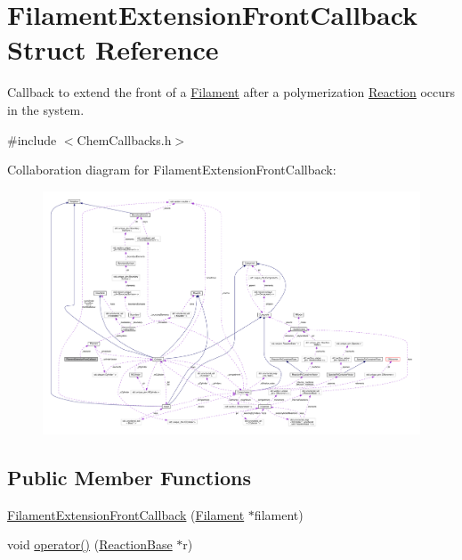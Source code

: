 \hypertarget{structFilamentExtensionFrontCallback}{\section{Filament\+Extension\+Front\+Callback Struct Reference}
\label{structFilamentExtensionFrontCallback}
}


Callback to extend the front of a \hyperlink{classFilament}{Filament} after a polymerization \hyperlink{classReaction}{Reaction} occurs in the system.  




{\ttfamily \#include $<$Chem\+Callbacks.\+h$>$}



Collaboration diagram for Filament\+Extension\+Front\+Callback\+:
\nopagebreak
\begin{figure}[H]
\begin{center}
\leavevmode
\includegraphics[width=350pt]{structFilamentExtensionFrontCallback__coll__graph}
\end{center}
\end{figure}
\subsection*{Public Member Functions}
\begin{DoxyCompactItemize}
\item 
\hyperlink{structFilamentExtensionFrontCallback_afeefc622c3eefa2e570ee06383cf2c75}{Filament\+Extension\+Front\+Callback} (\hyperlink{classFilament}{Filament} $\ast$filament)
\item 
void \hyperlink{structFilamentExtensionFrontCallback_a4d6d1bb7a9c175ee52db85a66c2e3f76}{operator()} (\hyperlink{classReactionBase}{Reaction\+Base} $\ast$r)
\end{DoxyCompactItemize}
